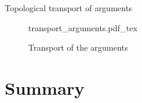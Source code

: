 \documentclass[english]{beamer}
\newcommand{\incfig}[1]{%
    \def\svgwidth{\columnwidth}
    {#1.pdf_tex}
}
\newcommand{\fig}[2]{
    \begin{figure}\begin{center}\texttt{[image: figures/\#1]}\caption{#2\label{#1}}\end{center}
    \end{figure}}
\begin{document}
\begin{frame}{Topological transport of arguments}



\begin{figure}
\begin{centering}
 \incfig{transport_arguments}
 \caption{Transport of the arguments}
 \end{centering}
\end{figure}



\end{frame}
% 
% 
% 
% 
% 
% 
% 
%         
%         
% 

\section*{Summary}
\end{document}
